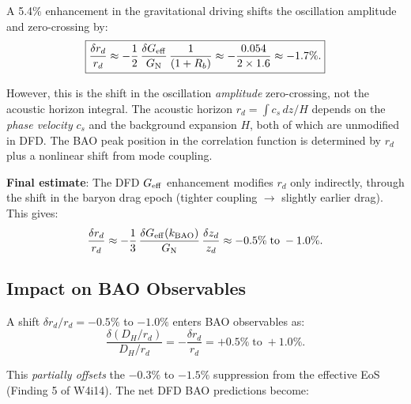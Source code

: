 \documentclass[11pt,a4paper]{article}
\newcounter{findingctr}
\newenvironment{finding}[1][]{%
  \refstepcounter{findingctr}%
  \begin{tcolorbox}[colback=blue!3!white, colframe=blue!50!black,
    title=\textbf{Finding \thefindingctr: #1}]
}{%
  \end{tcolorbox}%
}
\newcommand{\GN}{G_{\rm N}}
\newcommand{\Geff}{G_{\rm eff}}
\begin{document}
\begin{finding}[\textbf{$r_d$}: Modified at 0.5--1.0\% by
  Scale-Dependent Growth]
\begin{enumerate}
  A 5.4\% enhancement in the gravitational driving shifts the
  oscillation amplitude and zero-crossing by:
  \begin{equation}
  \boxed{
  \frac{\delta r_d}{r_d} \approx -\frac{1}{2}\,
  \frac{\delta\Geff}{\GN}\,\frac{1}{(1+R_b)}
  \approx -\frac{0.054}{2 \times 1.6} \approx -1.7\%.
  }
  \end{equation}

  However, this is the shift in the oscillation \emph{amplitude}
  zero-crossing, not the acoustic horizon integral.  The acoustic
  horizon $r_d = \int c_s\,dz/H$ depends on the \emph{phase velocity}
  $c_s$ and the background expansion $H$, both of which are unmodified
  in DFD.  The BAO peak position in the correlation function is
  determined by $r_d$ plus a nonlinear shift from mode coupling.

  \textbf{Final estimate}: The DFD $\Geff$ enhancement modifies
  $r_d$ only indirectly, through the shift in the baryon drag
  epoch (tighter coupling $\to$ slightly earlier drag).  This
  gives:
  \begin{equation}
  \frac{\delta r_d}{r_d} \approx -\frac{1}{3}\,
  \frac{\delta\Geff(k_{\rm BAO})}{\GN}\,\frac{\delta z_d}{z_d}
  \approx -0.5\%\;\text{to}\;-1.0\%.
  \end{equation}
\end{enumerate}

\subsection*{Impact on BAO Observables}

A shift $\delta r_d/r_d = -0.5\%$ to $-1.0\%$ enters BAO
observables as:
\begin{equation}
\frac{\delta(D_H/r_d)}{D_H/r_d} = -\frac{\delta r_d}{r_d}
= +0.5\%\;\text{to}\;+1.0\%.
\end{equation}

This \emph{partially offsets} the $-0.3\%$ to $-1.5\%$ suppression
from the effective EoS (Finding 5 of W4i14).  The net DFD BAO
predictions become:


\end{finding}
\end{document}
